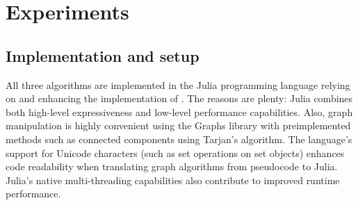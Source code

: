 \documentclass[a4paper]{article}
\begin{document}
%		
		
		
		
%		

\section{Experiments}

\subsection{Implementation and setup}

All three algorithms are implemented in the Julia programming language \cite{julia2012} relying on and enhancing the implementation of \cite{wienobst2022}. The reasons are plenty: Julia combines both high-level expressiveness and low-level performance capabilities. Also, graph manipulation is highly convenient using the Graphs library with preimplemented methods such as connected components using Tarjan's algorithm. The language's support for Unicode characters (such as set operations on set objects) enhances code readability when translating graph algorithms from pseudocode to Julia. Julia's native multi-threading capabilities also contribute to improved runtime performance. 
\end{document}
